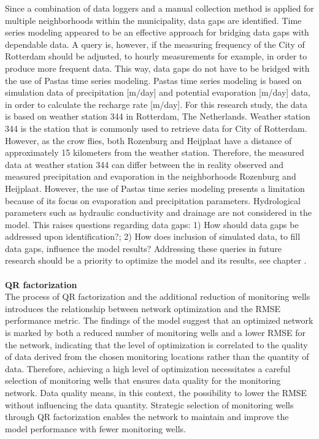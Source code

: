 Since a combination of data loggers and a manual collection method is applied for multiple neighborhoods within the municipality, data gaps are identified. Time series modeling appeared to be an effective approach for bridging data gaps with dependable data. A query is, however, if the measuring frequency of the City of Rotterdam should be adjusted, to hourly measurements for example, in order to produce more frequent data. This way, data gaps do not have to be bridged with the use of Pastas time series modeling. Pastas time series modeling is based on simulation data of precipitation [m/day] and potential evaporation [m/day] data, in order to calculate the recharge rate [m/day]. For this research study, the data is based on weather station 344 in Rotterdam, The Netherlands. Weather station 344 is the station that is commonly used to retrieve data for City of Rotterdam. However, as the crow flies, both Rozenburg and Heijplaat have a distance of approximately 15 kilometers from the weather station. Therefore, the measured data at weather station 344 can differ between the in reality observed and measured precipitation and evaporation in the neighborhoods Rozenburg and Heijplaat. However, the use of Pastas time series modeling presents a limitation because of its focus on evaporation and precipitation parameters. Hydrological parameters such as hydraulic conductivity and drainage are not considered in the model. This raises questions regarding data gaps: 1) How should data gaps be addressed upon identification?; 2) How does inclusion of simulated data, to fill data gaps, influence the model results? Addressing these queries in future research should be a priority to optimize the model and its results, see chapter . \\
\\
\textbf{QR factorization}\\
The process of QR factorization and the additional reduction of monitoring wells introduces the relationship between network optimization and the RMSE performance metric. The findings of the model suggest that an optimized network is marked by both a reduced number of monitoring wells and a lower RMSE for the network, indicating that the level of optimization is correlated to the quality of data derived from the chosen monitoring locations rather than the quantity of data. Therefore, achieving a high level of optimization necessitates a careful selection of monitoring wells that ensures data quality for the monitoring network. Data quality means, in this context, the possibility to lower the RMSE without influencing the data quantity. Strategic selection of monitoring wells through QR factorization enables the network to maintain and improve the model performance with fewer monitoring wells. \\

